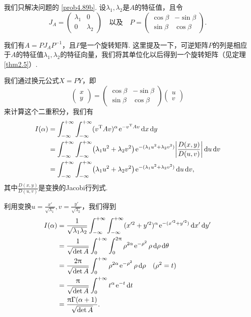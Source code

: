 \begin{solution}
  我们只解决问题的 \ref{prob4.89b}. 设$\lambda_1,\lambda_2$是$A$的特征值，且令
  \[
    J_A = \begin{pmatrix}
      \lambda_1 & 0 \\
      0 & \lambda_2
    \end{pmatrix}\quad \text{以及} \quad
    P = \begin{pmatrix}
      \cos\beta & - \sin\beta \\
      \sin\beta & \cos \beta
    \end{pmatrix}.
  \]

  \begin{nota}
    我们有$A=PJ_AP^{-1}$，且$P$是一个旋转矩阵. 这里提及一下，可逆矩阵$P$的列是相应于$A$的特征值$\lambda_1,\lambda_2$的特征向量，我们将其单位化以后得到一个旋转矩阵（见定理 \ref{thm2.5}）.
  \end{nota}

  我们通过换元公式$X=PY$，即
  \[
    \begin{pmatrix}
      x \\ y
    \end{pmatrix} = \begin{pmatrix}
      \cos\beta & - \sin\beta \\
      \sin\beta & \cos \beta
    \end{pmatrix}\begin{pmatrix}
      u \\ v
    \end{pmatrix}
  \]
  来计算这个二重积分，我们有
  \begin{align*}
    I(\alpha) & = \int_{-\infty}^{+\infty}\int_{-\infty}^{+\infty} (v\TT Av)^\alpha\ee^{-v\TT Av}\dif x\dif y \\
    & = \int_{-\infty}^{+\infty}\int_{-\infty}^{+\infty}
    \left( \lambda_1u^2 + \lambda_2v^2 \right) \ee^{-(\lambda_1u^2+\lambda_2v^2)}
    \left|\frac{D(x,y)}{D(u,v)}\right|\dif u \dif v \\
    & = \int_{-\infty}^{+\infty}\int_{-\infty}^{+\infty}
    \left( \lambda_1u^2 + \lambda_2v^2 \right) \ee^{-(\lambda_1u^2+\lambda_2v^2)} \dif u\dif v,
  \end{align*}
  其中$\frac{D(x,y)}{D(u,v)}$是变换的Jacobi行列式.

  利用变换$u=\frac{x'}{\sqrt{\lambda_1}},v=\frac{y'}{\sqrt{\lambda_2}}$，我们得到
  \begin{align*}
    I(\alpha) & = \frac1{\sqrt{\lambda_1\lambda_2}} \int_{-\infty}^{+\infty}\int_{-\infty}^{+\infty}
    (x'^2+y'^2)^\alpha \ee^{-(x'^2+y'^2)}\dif x'\dif y' \\
    & = \frac1{\sqrt{\det A}} \int_0^{+\infty}\int_0^{2\pi} \rho^{2\alpha}\ee^{-\rho^2}\rho \dif \rho \dif\theta \\
    & = \frac{2\pi}{\sqrt{\det A}}\int_0^{+\infty}
    \rho^{2\alpha}\ee^{-\rho^2}\rho \dif\rho\quad (\rho^2=t) \\
    & = \frac\pi{\sqrt{\det A}}\int_0^{+\infty}t^\alpha \ee^{-t} \dif t\\
    & = \frac{\pi\Gamma(\alpha+1)}{\sqrt{\det A}}.
  \end{align*}


\end{solution}
